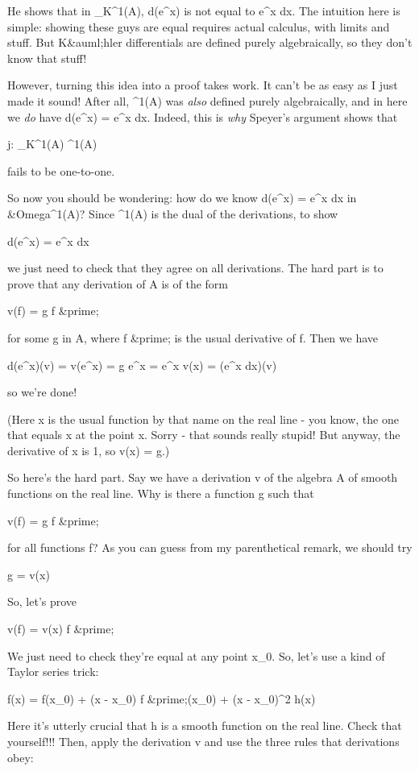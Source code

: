 He shows that in \Omega _{K}^{1}(A), d(e^{x})
is not equal to e^{x} dx.  The intuition here is simple:
showing these guys are equal requires actual calculus, with limits and
stuff.  But K&auml;hler differentials are defined purely
algebraically, so they don't know that stuff!

However, turning this idea into a proof takes work.  It can't be as
easy as I just made it sound!  After all, \Omega ^{1}(A) was
\emph{also} defined purely algebraically, and in here we \emph{do} have
d(e^{x}) = e^{x} dx.  Indeed, this is \emph{why} Speyer's
argument shows that

j: \Omega _{K}^{1}(A) \to  \Omega ^{1}(A)

fails to be one-to-one.

So now you should be wondering: how do we know d(e^{x}) =
e^{x} dx in &Omega^{1}(A)?  Since
\Omega ^{1}(A) is the dual of the derivations, to show

d(e^{x}) = e^{x} dx

we just need to check that they agree on all derivations.  The hard
part is to prove that any derivation of A is of the form

v(f) = g f &prime;

for some g in A, where f &prime; is the usual derivative of f.  Then we have

d(e^{x})(v) = v(e^{x}) = g e^{x} =
e^{x} v(x) = (e^{x} dx)(v)

so we're done!  

(Here x is the usual function by that name on the real line - you
know, the one that equals x at the point x.  Sorry - that sounds
really stupid!  But anyway, the derivative of x is 1, so v(x) = g.)

So here's the hard part.  Say we have a derivation v of the algebra A
of smooth functions on the real line.  Why is there a function g such
that 

v(f) = g f &prime; 

for all functions f?  As you can guess from my parenthetical remark,
we should try

g = v(x)

So, let's prove

v(f) = v(x) f &prime; 

We just need to check they're equal at any point x_{0}.  So, let's 
use a kind of Taylor series trick:

f(x) = f(x_{0}) + (x - x_{0}) f &prime;(x_{0})
+ (x - x_{0})^{2} h(x)

Here it's utterly crucial that h is a smooth function on the real
line.  Check that yourself!!!  Then, apply the derivation v and use 
the three rules that derivations obey:

